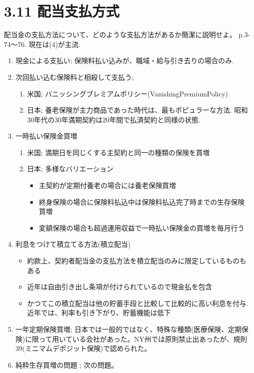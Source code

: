 \documentclass[report,gutter=10mm,fore-edge=10mm,uplatex,dvipdfmx]{jlreq}
\begin{document}
\section{3.11 配当支払方式}
配当金の支払方法について、どのような支払方法があるか簡潔に説明せよ。
p.3-74〜76. 現在は(4)が主流.
\begin{enumerate}[(1)]
 \item 現金による支払い;  保険料払い込みが、職域・給与引き去りの場合のみ.
 \item 次回払い込む保険料と相殺して支払う; 
\begin{enumerate}
 \item 米国; バニッシングブレミアムポリシー(VanishingPremiumPolicy)
 \item 日本; 養老保険が主力商品であった時代は、最もポピュラーな方法. 昭和30年代の30年満期契約は20年間で払済契約と同様の状態.
\end{enumerate}
 \item 一時払い保険金買増
\begin{enumerate}
 \item 米国; 満期日を同じくする主契約と同一の種類の保険を買増
 \item 日本; 多様なバリエーション
\begin{itemize}
 \item 主契約が定期付養老の場合には養老保険買増
 \item 終身保険の場合に保険料払込中は保険料払込完了時までの生存保険買増
 \item 変額保険の場合も超過運用収益で一時払い保険金の買増を毎月行う
\end{itemize}
\end{enumerate}
 \item 利息をつけて積立てる方法(積立配当)
\begin{itemize}
 \item 約款上、契約者配当金の支払方法を積立配当のみに限定しているものもある
 \item 近年は自由引き出し条項が付けられているので現金払を包含
 \item かつてこの積立配当は他の貯蓄手段と比較して比較的に高い利息を付与.   近年では、利率も引き下がり、貯蓄機能は低下
\end{itemize}
 \item 一年定期保険買増; 日本では一般的ではなく、特殊な種類(医療保険、定期保険)に限って用いている会社があった。NY州では原則禁止出あったが、規則39(ミニマムデポジット保険)で認められた。
 \item 純粋生存買増の問題 ; 次の問題。
\end{enumerate}
\end{document}
